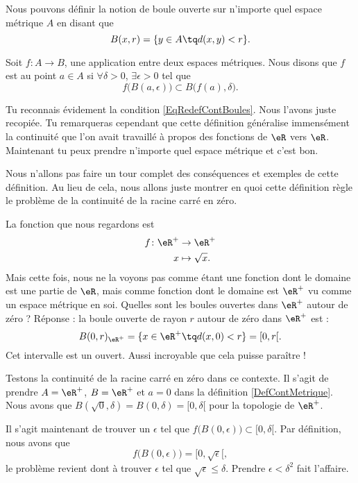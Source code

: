 Nous pouvons définir la notion de boule ouverte sur n'importe quel espace métrique $A$ en disant que
\[ 
  B(x,r)=\{ y\in A\tq d(x,y)<r \}.
\]
\begin{definition}		\label{DefContMetrique}
Soit $f\colon A\to B$, une application entre deux espaces métriques. Nous disons que $f$ est  au point $a\in A$ si $\forall \delta>0$, $\exists\epsilon>0$ tel que 
\begin{equation}
  f\big( B(a,\epsilon) \big)\subset B\big( f(a),\delta \big).
\end{equation}
\end{definition}
Tu reconnais évidement la condition \eqref{EqRedefContBoules}. Nous l'avons juste recopiée. Tu remarqueras cependant que cette définition généralise immensément la continuité que l'on avait travaillé à propos des fonctions de $\eR$ vers $\eR$. Maintenant tu peux prendre n'importe quel espace métrique et c'est bon.

Nous n'allons pas faire un tour complet des conséquences et exemples de cette définition. Au lieu de cela, nous allons juste montrer en quoi cette définition règle le problème de la continuité de la racine carré en zéro.

La fonction que nous regardons est 
\begin{equation}
\begin{aligned}
f \colon \eR^+&\to \eR^+ \\ 
   x&\mapsto \sqrt{x}.
\end{aligned}
\end{equation}
Mais cette fois, nous ne la voyons pas comme étant une fonction dont le domaine est une partie de $\eR$, mais comme fonction dont le domaine est $\eR^+$ vu comme un espace métrique en soi. Quelles sont les boules ouvertes dans $\eR^+$ autour de zéro ? Réponse : la boule ouverte de rayon $r$ autour de zéro dans $\eR^+$ est :
\[ 
  B(0,r)_{\eR^+}=\{ x\in\eR^+\tq d(x,0)<r \}=[0,r[.  
\]
Cet intervalle est un ouvert. Aussi incroyable que cela puisse paraître !

Testons la continuité de la racine carré en zéro dans ce contexte. Il s'agit de prendre $A=\eR^+$, $B=\eR^+$ et $a=0$ dans la définition \ref{DefContMetrique}. Nous avons que $B(\sqrt{0},\delta)=B(0,\delta)=[0,\delta[$ pour la topologie de $\eR^+$.

Il s'agit maintenant de trouver un $\epsilon$ tel que $f\big( B(0,\epsilon) \big)\subset [0,\delta[$. Par définition, nous avons que
\[ 
  f\big( B(0,\epsilon) \big)=[0,\sqrt{\epsilon}[,
\]
le problème revient dont à trouver $\epsilon$ tel que $\sqrt{\epsilon}\leq\delta$. Prendre $\epsilon<\delta^2$ fait l'affaire.


